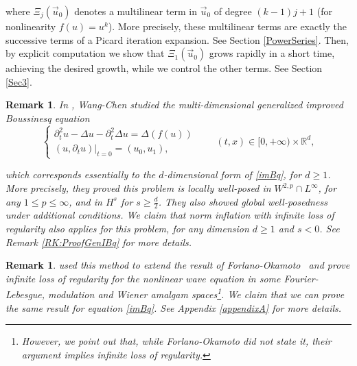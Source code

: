 \documentclass[letterpaper, 11pt,  reqno]{amsart}
\newtheorem{remark}[theorem]{Remark}
\newcommand{\1}{\hspace{0.5mm}\text{I}\hspace{0.5mm}}
\newcommand{\noi}{\noindent}
\newcommand{\R}{\mathbb{R}}
\newcommand{\Dl}{\Delta}
\newcommand{\dt}{\partial_t}
\numberwithin{equation}{section}
\numberwithin{theorem}{section}
\begin{document}
\noi where $\Xi_j (\vec{u}_0 )$ denotes a multilinear term in $\vec{u}_0$ of degree $(k-1)j + 1$ (for nonlinearity $f(u) = u^k$). %
More precisely, these multilinear terms are exactly the successive terms of a Picard iteration expansion. See Section \ref{PowerSeries}. Then, by explicit computation we show that $\Xi_1(\vec{u}_0)$ grows rapidly in a short time, achieving the desired growth, while we control the other terms. See Section \ref{Sec3}.
\begin{remark} \rm
In \cite{WC, WC2}, Wang-Chen studied the {\it multi-dimensional} generalized improved Boussinesq equation
\begin{equation}
\begin{cases}\label{generalizedimBq}
\dt^{2}u-\Dl u - \dt^2 \Dl u = \Dl \left(f(u) \right) \\
(u,\dt u)|_{t = 0} = (u_0,u_1), 
\end{cases}
\qquad ( t, x) \in [0, +\infty) \times \R^d, 
\end{equation}

\noi which corresponds essentially to the $d$-dimensional form of \eqref{imBq}, for $d \geq 1$. More precisely, they proved this problem is locally well-posed in $W^{2,p}\cap L^{\infty}$, for any $1 \leq p \leq \infty$, and in $H^s$ for $s \geq \frac d2$. They also showed global well-posedness under additional conditions. We claim that norm inflation with infinite loss of regularity also applies for this problem, for any dimension $d \geq 1$ and $s < 0$. See Remark \ref{RK:ProofGenIBq} for more details.
\end{remark}

\begin{remark} \rm
\label{REM:NIforFLMW}
\cite{BH} used this method to extend the result of Forlano-Okamoto~\cite{FO} and prove infinite loss of regularity for the nonlinear wave equation in some Fourier-Lebesgue, modulation and Wiener amalgam spaces\footnote{However, we point out that, while Forlano-Okamoto did not state it, their argument implies infinite loss of regularity.}. We claim that we can prove the same result for equation \eqref{imBq}. See Appendix \ref{appendixA} for more details.
\end{remark}



\end{document}
